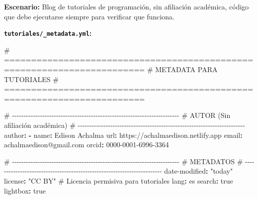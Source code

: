 \documentclass[
  doc,
  floatsintext,
  longtable,
  a4paper,
  nolmodern,
  notxfonts,
  notimes,
  12pt,
  colorlinks=true,linkcolor=blue,citecolor=blue,urlcolor=blue]{apa7}
\newenvironment{Shaded}{\begin{snugshade}}{\end{snugshade}}
\newcommand{\AttributeTok}[1]{\textcolor[rgb]{0.40,0.45,0.13}{#1}}
\newcommand{\CharTok}[1]{\textcolor[rgb]{0.13,0.47,0.30}{#1}}
\newcommand{\CommentTok}[1]{\textcolor[rgb]{0.37,0.37,0.37}{#1}}
\newcommand{\FunctionTok}[1]{\textcolor[rgb]{0.28,0.35,0.67}{#1}}
\newcommand{\KeywordTok}[1]{\textcolor[rgb]{0.00,0.23,0.31}{\textbf{#1}}}
\newcommand{\StringTok}[1]{\textcolor[rgb]{0.13,0.47,0.30}{#1}}
\begin{document}
\textbf{Escenario:} Blog de tutoriales de programación, sin afiliación
académica, código que debe ejecutarse siempre para verificar que
funciona.

\textbf{\texttt{tutoriales/\_metadata.yml}:}

\begin{Shaded}
\begin{Highlighting}[]
\CommentTok{\# ========================================================================}
\CommentTok{\# METADATA PARA TUTORIALES}
\CommentTok{\# ========================================================================}

\CommentTok{\# {-}{-}{-}{-}{-}{-}{-}{-}{-}{-}{-}{-}{-}{-}{-}{-}{-}{-}{-}{-}{-}{-}{-}{-}{-}{-}{-}{-}{-}{-}{-}{-}{-}{-}{-}{-}{-}{-}{-}{-}{-}{-}{-}{-}{-}{-}{-}{-}{-}{-}{-}{-}{-}{-}{-}{-}{-}{-}{-}{-}{-}{-}{-}{-}{-}{-}{-}{-}{-}{-}{-}{-}}
\CommentTok{\# AUTOR (Sin afiliación académica)}
\CommentTok{\# {-}{-}{-}{-}{-}{-}{-}{-}{-}{-}{-}{-}{-}{-}{-}{-}{-}{-}{-}{-}{-}{-}{-}{-}{-}{-}{-}{-}{-}{-}{-}{-}{-}{-}{-}{-}{-}{-}{-}{-}{-}{-}{-}{-}{-}{-}{-}{-}{-}{-}{-}{-}{-}{-}{-}{-}{-}{-}{-}{-}{-}{-}{-}{-}{-}{-}{-}{-}{-}{-}{-}{-}}
\FunctionTok{author}\KeywordTok{:}
\AttributeTok{  }\KeywordTok{{-}}\AttributeTok{ }\FunctionTok{name}\KeywordTok{:}\AttributeTok{ Edison Achalma}
\AttributeTok{    }\FunctionTok{url}\KeywordTok{:}\AttributeTok{ https://achalmaedison.netlify.app}
\AttributeTok{    }\FunctionTok{email}\KeywordTok{:}\AttributeTok{ achalmaedison@gmail.com}
\AttributeTok{    }\FunctionTok{orcid}\KeywordTok{:}\AttributeTok{ 0000{-}0001{-}6996{-}3364}

\CommentTok{\# {-}{-}{-}{-}{-}{-}{-}{-}{-}{-}{-}{-}{-}{-}{-}{-}{-}{-}{-}{-}{-}{-}{-}{-}{-}{-}{-}{-}{-}{-}{-}{-}{-}{-}{-}{-}{-}{-}{-}{-}{-}{-}{-}{-}{-}{-}{-}{-}{-}{-}{-}{-}{-}{-}{-}{-}{-}{-}{-}{-}{-}{-}{-}{-}{-}{-}{-}{-}{-}{-}{-}{-}}
\CommentTok{\# METADATOS}
\CommentTok{\# {-}{-}{-}{-}{-}{-}{-}{-}{-}{-}{-}{-}{-}{-}{-}{-}{-}{-}{-}{-}{-}{-}{-}{-}{-}{-}{-}{-}{-}{-}{-}{-}{-}{-}{-}{-}{-}{-}{-}{-}{-}{-}{-}{-}{-}{-}{-}{-}{-}{-}{-}{-}{-}{-}{-}{-}{-}{-}{-}{-}{-}{-}{-}{-}{-}{-}{-}{-}{-}{-}{-}{-}}
\FunctionTok{date{-}modified}\KeywordTok{:}\AttributeTok{ }\StringTok{"today"}
\FunctionTok{license}\KeywordTok{:}\AttributeTok{ }\StringTok{"CC BY"}\CommentTok{            \# Licencia permisiva para tutoriales}
\FunctionTok{lang}\KeywordTok{:}\AttributeTok{ es}
\FunctionTok{search}\KeywordTok{:}\AttributeTok{ }\CharTok{true}
\FunctionTok{lightbox}\KeywordTok{:}\AttributeTok{ }\CharTok{true}


\end{Highlighting}
\end{Shaded}
\end{document}
